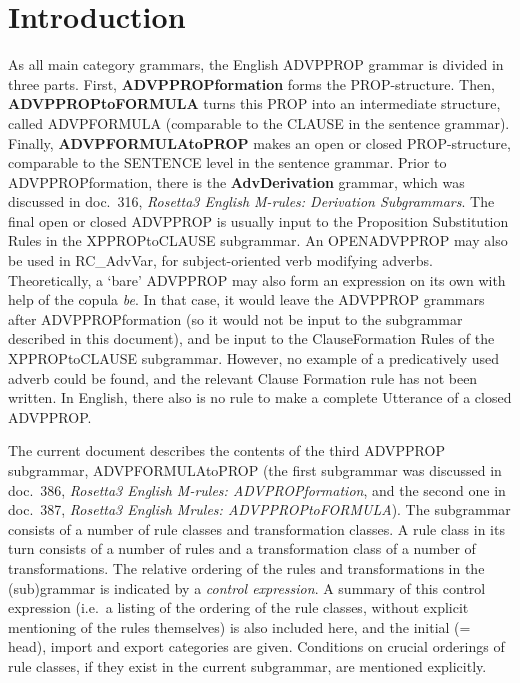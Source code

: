 
   \RosDate{\today}
   \RosSupersedes{-}
   \MakeRosTitle
%
%

\section{Introduction}
As all main category grammars, the English ADVPPROP grammar is divided in 
three parts. First, {\bf ADVPPROPformation} forms the PROP-structure. Then, {
\bf ADVP\-PROPtoFORMULA} turns this PROP into an intermediate structure, called 
ADVPFORMULA
(comparable to the CLAUSE in the sentence grammar). Finally, {\bf 
ADVPFORMULAtoPROP} makes an open or closed PROP-structure, comparable to the 
SENTENCE level in the sentence grammar. Prior to ADVPPROPformation, there is 
the {\bf AdvDerivation} grammar, which was discussed in doc.\ 316, {\em 
Rosetta3 English M-rules: Derivation Subgrammars\/}. The final open or closed 
ADVPPROP is usually input to the Proposition Substitution Rules in the 
XPPROPtoCLAUSE subgrammar. An OPENADVPPROP may also be used in RC\_AdvVar, for 
subject-oriented verb modifying adverbs. Theoretically, a
 `bare' ADVPPROP may also form an expression on 
its own with help of the copula {\em be\/}. In that case, it would leave the 
ADVPPROP grammars after ADVPPROPformation (so it would not be input to the 
subgrammar described in this document), and 
be input to the ClauseFormation Rules of the XPPROPtoCLAUSE subgrammar. 
However, no example of a predicatively used adverb could be found, and the 
relevant Clause Formation rule has not been written.
In English, there also is no rule to make a complete Utterance of a closed 
ADVPPROP.

The current document describes the contents of the third ADVPPROP subgrammar, 
ADVPFORMULAtoPROP (the first subgrammar was discussed in doc.\ 386, {\em 
Rosetta3 English M-rules: ADVPROPformation\/}, and the second one 
in doc.\ 387, {\em Rosetta3 English Mrules: ADVPPROPtoFORMULA\/}). 
The subgrammar consists of 
a number of rule classes and transformation classes. A rule class in its turn
consists of a number of rules and a transformation class of a number of 
transformations. The relative ordering of the rules and transformations in the
(sub)grammar is indicated by a {\em control expression}. A summary of this
control expression (i.e.\ a listing of the ordering of the rule classes, 
without explicit mentioning of the rules themselves) is also included here, 
and the initial (= head), import and export categories are given. Conditions on 
crucial orderings of rule classes, if they exist in the current subgrammar, are 
mentioned explicitly.

